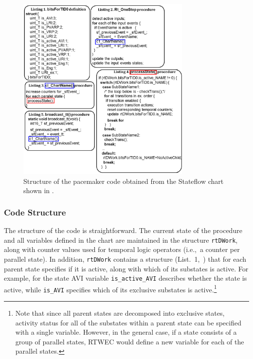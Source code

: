 \begin{figure} [!t]
\center
\includegraphics[width=0.77\textwidth]{figs/CodeListingFinal.png}
\caption{Structure of the pacemaker code obtained from the Stateflow chart shown in .}
\label{fig:pm_code}
\end{figure}


\subsubsection{Code Structure}
The structure of the code is straightforward. The current state of the procedure and all variables defined in the chart are maintained in the structure \texttt{rtDWork}, along with counter values used for temporal logic operators (i.e.,~a counter per parallel state). In addition, \texttt{rtDWork} contains a structure (List.~1,~) that for each parent state specifies if it is active, along with which of its substates is active. 
For example, for the state AVI variable \texttt{is\_active\_AVI} describes whether the state is active, while \texttt{is\_AVI} specifies which of its exclusive substates is active.\footnote{Note that since all parent states are decomposed into exclusive states, activity status for all of the substates within a parent state can be specified with a single variable. However, in the general case, if a state consists of a group of parallel states, RTWEC would define a new variable for each of the parallel states.}


